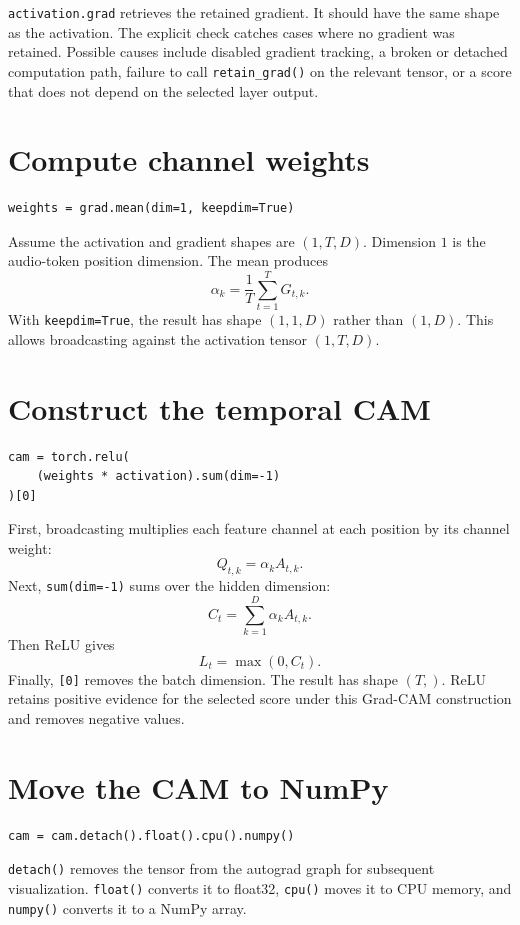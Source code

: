 \documentclass[11pt,a4paper]{article}
\begin{document}
\texttt{activation.grad} retrieves the retained gradient. It should have the same shape as the activation. The explicit check catches cases where no gradient was retained. Possible causes include disabled gradient tracking, a broken or detached computation path, failure to call \texttt{retain\_grad()} on the relevant tensor, or a score that does not depend on the selected layer output.

\section{Compute channel weights}
\begin{lstlisting}[style=python]
weights = grad.mean(dim=1, keepdim=True)
\end{lstlisting}
Assume the activation and gradient shapes are $(1,T,D)$. Dimension $1$ is the audio-token position dimension. The mean produces
\[
\alpha_k=\frac{1}{T}\sum_{t=1}^{T}G_{t,k}.
\]
With \texttt{keepdim=True}, the result has shape $(1,1,D)$ rather than $(1,D)$. This allows broadcasting against the activation tensor $(1,T,D)$.

\section{Construct the temporal CAM}
\begin{lstlisting}[style=python]
cam = torch.relu(
    (weights * activation).sum(dim=-1)
)[0]
\end{lstlisting}
First, broadcasting multiplies each feature channel at each position by its channel weight:
\[
Q_{t,k}=\alpha_k A_{t,k}.
\]
Next, \texttt{sum(dim=-1)} sums over the hidden dimension:
\[
C_t=\sum_{k=1}^{D}\alpha_k A_{t,k}.
\]
Then ReLU gives
\[
L_t=\max(0,C_t).
\]
Finally, \texttt{[0]} removes the batch dimension. The result has shape $(T,)$. ReLU retains positive evidence for the selected score under this Grad-CAM construction and removes negative values.

\section{Move the CAM to NumPy}
\begin{lstlisting}[style=python]
cam = cam.detach().float().cpu().numpy()
\end{lstlisting}
\texttt{detach()} removes the tensor from the autograd graph for subsequent visualization. \texttt{float()} converts it to float32, \texttt{cpu()} moves it to CPU memory, and \texttt{numpy()} converts it to a NumPy array.
\end{document}
